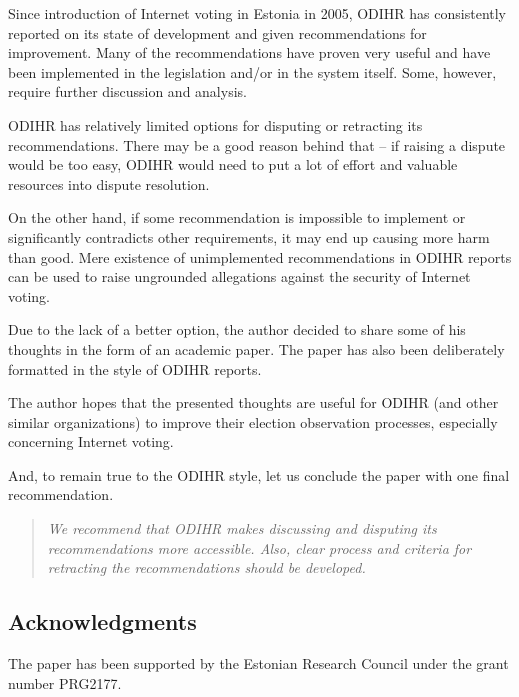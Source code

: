 \documentclass{llncs}
\begin{document}
Since introduction of Internet voting in Estonia in 2005, ODIHR has consistently reported on its state of development and given recommendations for improvement. Many of the recommendations have proven very useful and have been implemented in the legislation and/or in the system itself. Some, however, require further discussion and analysis. 

ODIHR has relatively limited options for disputing or retracting its recommendations. There may be a good reason behind that -- if raising a dispute would be too easy, ODIHR would need to put a lot of effort and valuable resources into dispute resolution.

On the other hand, if some recommendation is impossible to implement or significantly contradicts other requirements, it may end up causing more harm than good. Mere existence of unimplemented recommendations in ODIHR reports can be used to raise ungrounded allegations against the security of Internet voting.

Due to the lack of a better option, the author decided to share some of his thoughts in the form of an academic paper. The paper has also been deliberately formatted in the style of ODIHR reports.

The author hopes that the presented thoughts are useful for ODIHR (and other similar organizations) to improve their election observation processes, especially concerning Internet voting. 

And, to remain true to the ODIHR style, let us conclude the paper with one final recommendation.

\begin{quote}
    \emph{We recommend that ODIHR makes discussing and disputing its recommendations more accessible. Also, clear process and criteria for retracting the recommendations should be developed.}
\end{quote}

\subsection*{Acknowledgments}

The paper has been supported by the Estonian Research Council under the grant
number PRG2177.



\end{document}
